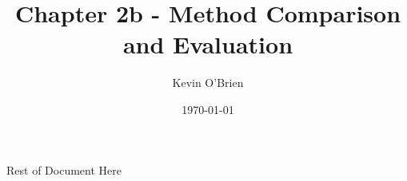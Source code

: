 \documentclass[12pt, a4paper]{report}
\begin{document}
\author{Kevin O'Brien}
\title{Chapter 2b - Method Comparison and Evaluation}
\date{\today}
\maketitle

\tableofcontents \setcounter{tocdepth}{2}






\newpage
Rest of Document Here












\end{document}
